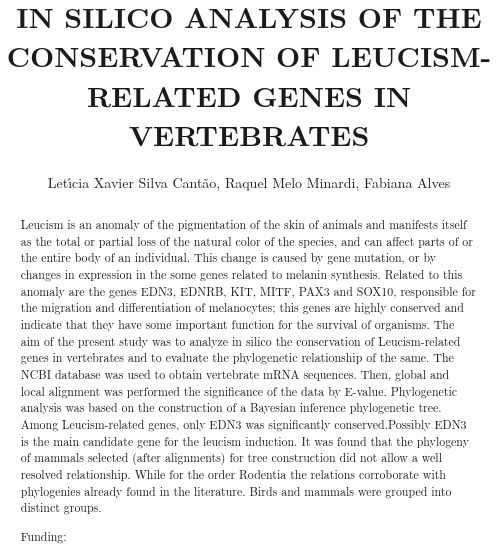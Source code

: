 \documentclass[twoside]{article}
\title{\vspace{-15mm}\fontsize{24pt}{10pt}\selectfont\textbf{ IN SILICO ANALYSIS OF THE CONSERVATION OF LEUCISM-RELATED GENES IN VERTEBRATES }} %
\author{ Let\'{\i}cia Xavier Silva Cant\~ao, Raquel Melo Minardi, Fabiana Alves }
\affil{ Universidade Federal de Minas Gerais - UFMG }
\date{}
\begin{document}
  
  
  \maketitle %
  
  
  \thispagestyle{fancy} %
  
  
  \begin{abstract}
  Leucism is an anomaly of the pigmentation of the skin of animals and manifests itself as the total or partial loss of the natural color of the species,  and can affect parts of or the entire body of an individual. This change is caused by gene mutation,  or by changes in expression in the some genes related to melanin synthesis. Related to this anomaly are the genes EDN3,  EDNRB,  KIT,  MITF,  PAX3 and SOX10,  responsible for the migration and differentiation of melanocytes; this genes are highly conserved  and indicate that they have some important function for the survival of organisms. The aim of the present study was to analyze in silico the conservation of Leucism-related genes in vertebrates and to evaluate the phylogenetic relationship of the same. The NCBI database was used to obtain vertebrate mRNA sequences. Then,  global and local alignment was performed  the significance of the data by E-value. Phylogenetic analysis was based on the construction of a Bayesian inference phylogenetic tree. Among Leucism-related genes,  only EDN3 was significantly conserved.Possibly EDN3 is the main candidate gene for the leucism induction. It was found that the phylogeny of mammals selected (after alignments) for tree construction did not allow a well resolved relationship. While for the order Rodentia the relations corroborate with phylogenies already found in the literature. Birds and mammals were grouped into distinct groups.
  
  Funding:  \\ 
  \end{abstract}
  
\end{document}
